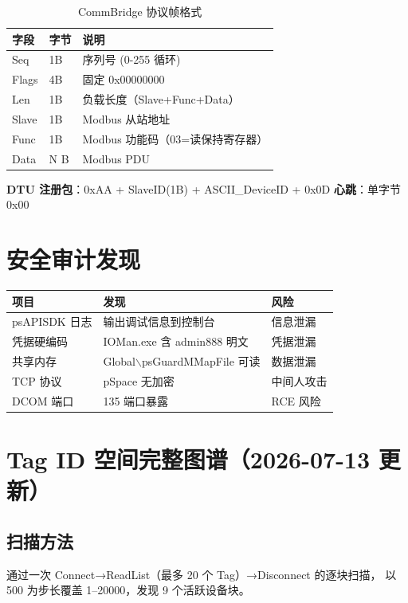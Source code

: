 \documentclass[12pt,a4paper]{ctexart}
\begin{document}
\begin{table}[H]\centering
\caption{CommBridge 协议帧格式}
\begin{tabular}{lll}
\toprule
\textbf{字段} & \textbf{字节} & \textbf{说明} \\
\midrule
Seq & 1B & 序列号 (0-255 循环) \\
Flags & 4B & 固定 0x00000000 \\
Len & 1B & 负载长度（Slave+Func+Data） \\
Slave & 1B & Modbus 从站地址 \\
Func & 1B & Modbus 功能码（03=读保持寄存器） \\
Data & N B & Modbus PDU \\
\bottomrule
\end{tabular}
\end{table}

\textbf{DTU 注册包}：0xAA + SlaveID(1B) + ASCII\_DeviceID + 0x0D
\textbf{心跳}：单字节 0x00

\section{安全审计发现}

\begin{table}[H]\centering
\begin{tabular}{lll}
\toprule
\textbf{项目} & \textbf{发现} & \textbf{风险} \\
\midrule
psAPISDK 日志 & 输出调试信息到控制台 & 信息泄漏 \\
\multicolumn{1}{l}{凭据硬编码} & IOMan.exe 含 admin888 明文 & 凭据泄漏 \\
\multicolumn{1}{l}{共享内存} & Global$\backslash$psGuardMMapFile 可读 & 数据泄漏 \\
\multicolumn{1}{l}{TCP 协议} & pSpace 无加密 & 中间人攻击 \\
DCOM 端口 & 135 端口暴露 & RCE 风险 \\
\bottomrule
\end{tabular}
\end{table}

\section{Tag ID 空间完整图谱（2026-07-13 更新）}

\subsection{扫描方法}
通过一次 Connect→ReadList（最多 20 个 Tag）→Disconnect 的逐块扫描，
以 500 为步长覆盖 1--20000，发现 9 个活跃设备块。
\end{document}
